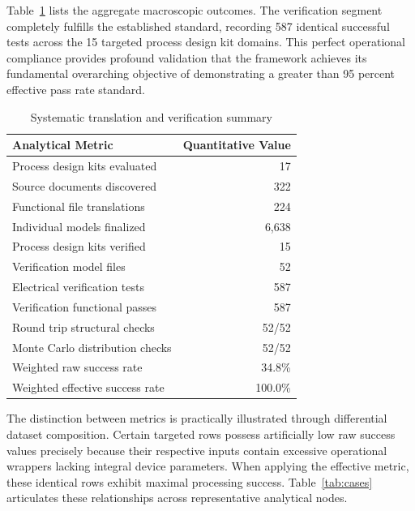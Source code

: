 \documentclass[10pt,twocolumn]{article}
\begin{document}
Table~\ref{tab:summary} lists the aggregate macroscopic outcomes. The verification segment completely fulfills the established standard, recording 587 identical successful tests across the 15 targeted process design kit domains. This perfect operational compliance provides profound validation that the framework achieves its fundamental overarching objective of demonstrating a greater than 95 percent effective pass rate standard.

\begin{table}[t]
\caption{Systematic translation and verification summary}
\label{tab:summary}
\centering
\renewcommand{\arraystretch}{1.1}
\begin{tabular}{@{}lr@{}}
\toprule
Analytical Metric & Quantitative Value \\
\midrule
Process design kits evaluated & 17 \\
Source documents discovered & 322 \\
Functional file translations & 224 \\
Individual models finalized & 6,638 \\
Process design kits verified & 15 \\
Verification model files & 52 \\
Electrical verification tests & 587 \\
Verification functional passes & 587 \\
Round trip structural checks & 52/52 \\
Monte Carlo distribution checks & 52/52 \\
Weighted raw success rate & 34.8\% \\
Weighted effective success rate & 100.0\% \\
\bottomrule
\end{tabular}
\end{table}

The distinction between metrics is practically illustrated through differential dataset composition. Certain targeted rows possess artificially low raw success values precisely because their respective inputs contain excessive operational wrappers lacking integral device parameters. When applying the effective metric, these identical rows exhibit maximal processing success. Table~\ref{tab:cases} articulates these relationships across representative analytical nodes.
\end{document}
